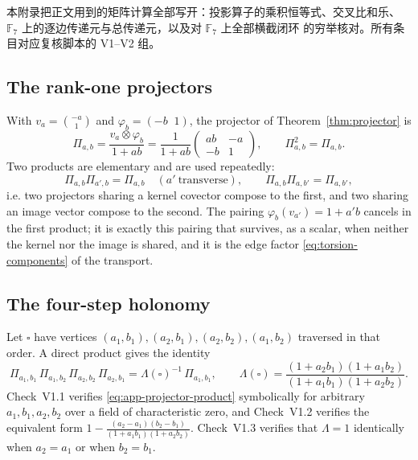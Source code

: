 
\begin{cnread}
本附录把正文用到的矩阵计算全部写开：投影算子的乘积恒等式、交叉比和乐、
$\mathbb F_7$ 上的逐边传递元与总传递元，以及对 $\mathbb F_7$ 上全部横截闭环
的穷举核对。所有条目对应复核脚本的 V1--V2 组。
\end{cnread}

\subsection{The rank-one projectors}

With $v_a=\binom{-a}{1}$ and $\varphi_b=(-b\;\;1)$, the projector of
Theorem~\ref{thm:projector} is
\begin{equation}\label{eq:projector-again}
  \Pi_{a,b}=\frac{v_a\otimes\varphi_b}{1+ab}
  =\frac{1}{1+ab}\begin{pmatrix}ab&-a\\-b&1\end{pmatrix},
  \qquad \Pi_{a,b}^{2}=\Pi_{a,b}.
\end{equation}
Two products are elementary and are used repeatedly:
\begin{equation}\label{eq:projector-products}
  \Pi_{a,b}\Pi_{a',b}=\Pi_{a,b}
  \quad(a'\ \text{transverse}),
  \qquad
  \Pi_{a,b}\Pi_{a,b'}=\Pi_{a,b'},
\end{equation}
i.e. two projectors sharing a kernel covector compose to the first, and two
sharing an image vector compose to the second.  The pairing
$\varphi_b(v_{a'})=1+a'b$ cancels in the first product; it is exactly this
pairing that survives, as a scalar, when neither the kernel nor the image is
shared, and it is the edge factor \eqref{eq:torsion-components} of the
transport.

\subsection{The four-step holonomy}

Let $\square$ have vertices $(a_1,b_1),(a_2,b_1),(a_2,b_2),(a_1,b_2)$ traversed
in that order.  A direct product gives the identity
\begin{equation}\label{eq:app-projector-product}
  \Pi_{a_1,b_1}\,\Pi_{a_1,b_2}\,\Pi_{a_2,b_2}\,\Pi_{a_2,b_1}
  =\Lambda(\square)^{-1}\,\Pi_{a_1,b_1},
  \qquad
  \Lambda(\square)=\frac{(1+a_2b_1)(1+a_1b_2)}{(1+a_1b_1)(1+a_2b_2)} .
\end{equation}
Check~V1.1 verifies \eqref{eq:app-projector-product} symbolically for arbitrary
$a_1,b_1,a_2,b_2$ over a field of characteristic zero, and Check~V1.2 verifies
the equivalent form $1-\frac{(a_2-a_1)(b_2-b_1)}{(1+a_1b_1)(1+a_2b_2)}$.
Check~V1.3 verifies that $\Lambda=1$ identically when $a_2=a_1$ or when
$b_2=b_1$.


